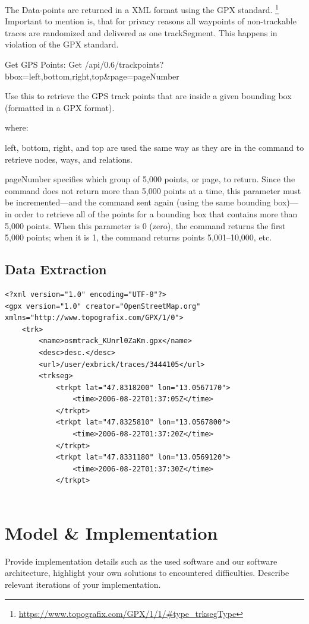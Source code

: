 The Data-points are returned in a XML format using the GPX standard. \footnote{\url{https://www.topografix.com/GPX/1/1/#type_trksegType}} Important to mention is, that for privacy reasons all waypoints of non-trackable traces are randomized and delivered as one trackSegment. This happens in violation of the GPX standard. 

Get GPS Points: Get /api/0.6/trackpoints?bbox=left,bottom,right,top&page=pageNumber


Use this to retrieve the GPS track points that are inside a given bounding box (formatted in a GPX format).

where:

left, bottom, right, and top are used the same way as they are in the command to retrieve nodes, ways, and relations.

pageNumber specifies which group of 5,000 points, or page, to return. Since the command does not return more than 5,000 points at a time, this parameter must be incremented—and the command sent again (using the same bounding box)—in order to retrieve all of the points for a bounding box that contains more than 5,000 points. When this parameter is 0 (zero), the command returns the first 5,000 points; when it is 1, the command returns points 5,001–10,000, etc.


\subsection{Data Extraction}


\begin{lstlisting}
<?xml version="1.0" encoding="UTF-8"?>
<gpx version="1.0" creator="OpenStreetMap.org" xmlns="http://www.topografix.com/GPX/1/0">
    <trk>
        <name>osmtrack_KUnrl0ZaKm.gpx</name>
        <desc>desc.</desc>
        <url>/user/exbrick/traces/3444105</url>
        <trkseg>
            <trkpt lat="47.8318200" lon="13.0567170">
                <time>2006-08-22T01:37:05Z</time>
            </trkpt>
            <trkpt lat="47.8325810" lon="13.0567800">
                <time>2006-08-22T01:37:20Z</time>
            </trkpt>
            <trkpt lat="47.8331180" lon="13.0569120">
                <time>2006-08-22T01:37:30Z</time>
            </trkpt>
            
\end{lstlisting}




\section{Model & Implementation}
Provide implementation details such as the used software and our software architecture, highlight your own solutions to encountered difficulties. Describe relevant iterations of your implementation.

